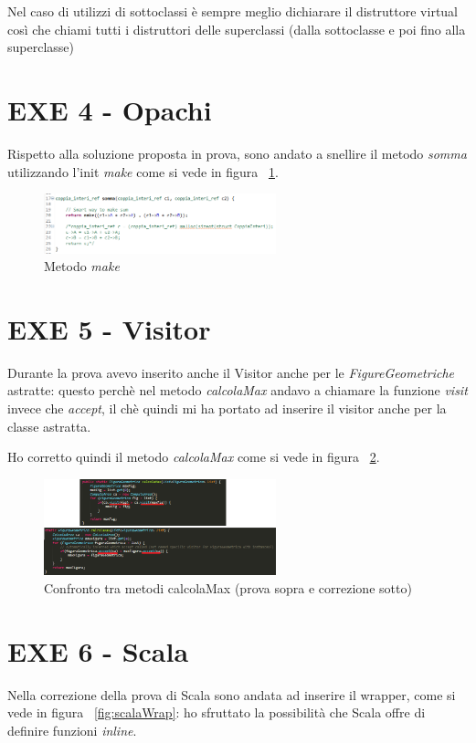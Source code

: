 Nel caso di utilizzi di sottoclassi è sempre meglio dichiarare il distruttore virtual così che chiami tutti i distruttori delle superclassi (dalla sottoclasse e poi fino alla superclasse)
\section{EXE 4 - Opachi}

Rispetto alla soluzione proposta in prova, sono andato a snellire il metodo \textit{somma} utilizzando l'init \textit{make} come si vede in figura ~\ref{fig:makeSomma}.

\begin{figure}[h]
	\centering
	\includegraphics[width=0.6\textwidth]{Immagini/makeSommaOpachi.png}
	\caption{Metodo \textit{make}}
	\label{fig:makeSomma}
\end{figure}

\section{EXE 5 - Visitor}
Durante la prova avevo inserito anche il Visitor anche per le \textit{FigureGeometriche} astratte: questo perchè nel metodo \textit{calcolaMax} andavo a chiamare la funzione \textit{visit} invece che \textit{accept}, il chè quindi mi ha portato ad inserire il visitor anche per la classe astratta.

Ho corretto quindi il metodo \textit{calcolaMax} come si vede in figura ~\ref{fig:calcolaMax}.

\begin{figure}[h]
	\centering
	\includegraphics[width=0.6\textwidth]{Immagini/calcolaMax.png}
	\caption{Confronto tra metodi calcolaMax (prova sopra e correzione sotto)}
	\label{fig:calcolaMax}
\end{figure}

\section{EXE 6 - Scala}
Nella correzione della prova di Scala sono andata ad inserire il wrapper, come si vede in figura ~\ref{fig:scalaWrap}: ho sfruttato la possibilità che Scala offre di definire funzioni \textit{inline}.

